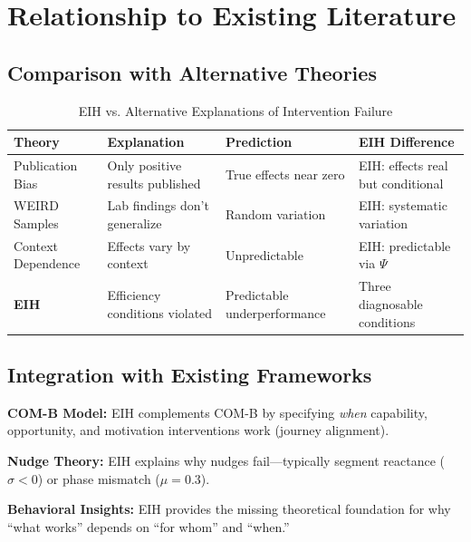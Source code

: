 \section{Relationship to Existing Literature}
\label{sec:eih-literature}

\subsection{Comparison with Alternative Theories}

\begin{table}[htbp]
\centering
\caption{EIH vs. Alternative Explanations of Intervention Failure}
\label{tab:alternatives}
\renewcommand{\arraystretch}{1.3}
\begin{tabular}{@{}lp{4cm}p{4cm}p{3cm}@{}}
\toprule
\textbf{Theory} & \textbf{Explanation} & \textbf{Prediction} & \textbf{EIH Difference} \\
\midrule
Publication Bias & Only positive results published & True effects near zero & EIH: effects real but conditional \\
WEIRD Samples & Lab findings don't generalize & Random variation & EIH: systematic variation \\
Context Dependence & Effects vary by context & Unpredictable & EIH: predictable via $\Psi$ \\
\textbf{EIH} & Efficiency conditions violated & Predictable underperformance & Three diagnosable conditions \\
\bottomrule
\end{tabular}
\end{table}

\subsection{Integration with Existing Frameworks}

\textbf{COM-B Model:} EIH complements COM-B by specifying \textit{when} capability,
opportunity, and motivation interventions work (journey alignment).

\textbf{Nudge Theory:} EIH explains why nudges fail---typically segment reactance
($\sigma < 0$) or phase mismatch ($\mu = 0.3$).

\textbf{Behavioral Insights:} EIH provides the missing theoretical foundation
for why ``what works'' depends on ``for whom'' and ``when.''


